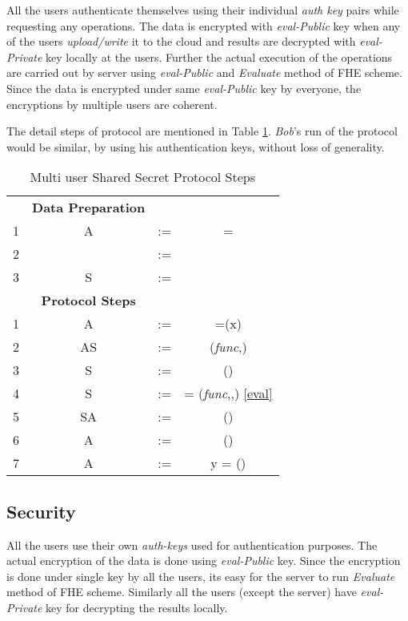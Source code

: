 \documentclass[conference]{IEEEtran}
\numberwithin{equation}{section}
\begin{document}
All the users authenticate themselves using their individual \emph{auth key} pairs while requesting any operations.  The data is encrypted with \emph{eval-Public} key when any of the users \emph{upload/write} it to the cloud and results are decrypted with \emph{eval-Private} key locally at the users. Further the actual execution of the operations are carried out by server using \emph{eval-Public} and \emph{Evaluate} method of FHE scheme.  Since the data is encrypted under same \emph{eval-Public} key by everyone, the encryptions by multiple users are coherent. 

The detail steps of protocol are mentioned in Table \ref{msspProtocol}. \emph{ Bob}'s run of the protocol would be similar, by using his authentication keys, without loss of generality.

\begin{table}
\caption{Multi user Shared Secret Protocol Steps }
\label{msspProtocol}
\renewcommand{\arraystretch}{2.5}
\begin{center}
\begin{tabular} {| c c c c | }
\hline
&\bf{Data Preparation}&&  \\
1 & A &  :=  &  =  \\
2 &  & := & \\ 
3 & S &  := & \\
\hline
\hline
&\bf{Protocol Steps}&&\\
{1} & {A} & {:=} & {{}=(x)} \\
{2} & {AS}&{:=}&{ (\emph{func},) } \\
{3}&{S}&{:=} & {()} \\
{4} &{S}&{:=}&{ {}= (\emph{func},,) \eqref{eval}} \\
{5}&{SA}&{:=}&{  ()} \\
{6}&{A}&{:=}&{ () } \\
{7}&{A}&{:=}&{y =  ()} \\
\hline
\end{tabular} 
\end{center}
\end{table}
\subsection{Security}

All the users use their own \emph{auth-keys} used for authentication purposes. The actual encryption of the data is done using \emph{eval-Public} key. Since the encryption is done under single key by all the users, its easy for the server to run \emph{Evaluate} method of FHE scheme. Similarly all the users (except the server) have \emph{eval-Private} key for decrypting the results locally.
\end{document}
